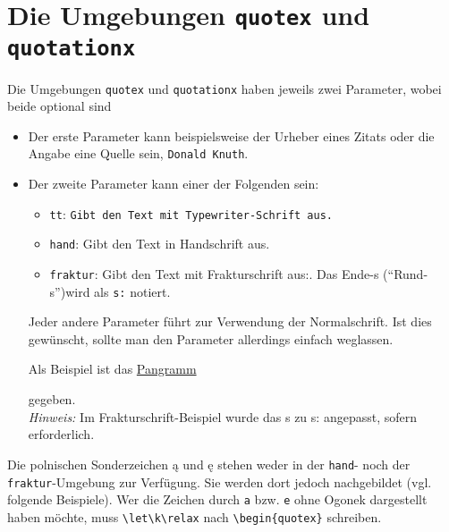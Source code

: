 			
		\section{Die Umgebungen \texttt{quotex} und \texttt{quotationx}}
			\label{quotex_quotationx}
			
			Die Umgebungen \texttt{quotex} und \texttt{quotationx} haben jeweils zwei Parameter, wobei beide optional sind
			\begin{itemize}
				\item Der erste Parameter kann beispielsweise der Urheber eines Zitats oder die Angabe eine Quelle sein, \zb \texttt{Donald Knuth}.
				\item Der zweite Parameter kann einer der Folgenden sein:
					\begin{itemize}
						\item \texttt{tt}: {\tt Gibt den Text mit Typewriter-Schrift aus.}
						\item \texttt{hand}: {\oeschfamily Gibt den Text in Handschrift aus.}
						\item \texttt{fraktur}: {\frakfamily Gibt den Text mit Frakturschrift aus:.} Das Ende-s ("`Rund-s"')wird als \verb|s:| notiert.
					\end{itemize}
					Jeder andere Parameter führt zur Verwendung der Normalschrift. Ist dies gewünscht, sollte man den Parameter allerdings einfach weglassen. 
					
					\newpage
					Als Beispiel ist das \href{https://de.wikipedia.org/wiki/Pangramm\#Liste_deutscher_Pangramme}{Pangramm} 
					\begin{quote}
						\pangramm
					\end{quote}
					gegeben.\\
					\emph{Hinweis:} Im Frakturschrift-Beispiel wurde das {\frakfamily s} zu {\frakfamily s:} angepasst, sofern erforderlich.
			\end{itemize}
			
			\begin{redbox}
				Die polnischen Sonderzeichen \k a und \k e stehen weder in der \texttt{hand}- noch der \texttt{fraktur}-Umgebung zur Verfügung. Sie werden dort jedoch nachgebildet (vgl. folgende Beispiele). Wer die Zeichen durch \texttt{a} bzw. \texttt{e} ohne Ogonek dargestellt haben möchte, muss \verb|\let\k\relax| nach \texttt{\textbackslash begin\{quotex\}} schreiben. 
			\end{redbox}
			
